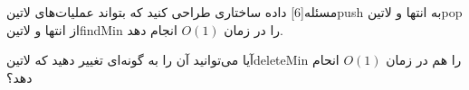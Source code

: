 
‌مسئله[6]
داده ساختاری طراحی کنید که بتواند عملیات‌‌های 
‌لاتین{push} به انتها و 
‌لاتین{pop} از انتها و
‌لاتین{findMin}
 را در زمان
$O(1)$
انجام دهد.

آیا می‌توانید آن را به گونه‌‌ای تغییر دهید که 
‌لاتین{deleteMin}
 را هم در زمان 
$O(1)$
انحام دهد؟













